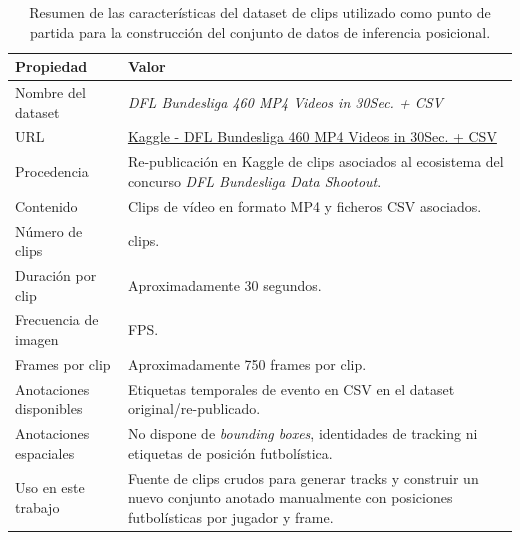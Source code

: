 \begin{table}[H]
\centering
\scriptsize
\renewcommand{\arraystretch}{1.2}
\begin{tabularx}{\textwidth}{
>{\raggedright\arraybackslash}p{4.0cm}
>{\raggedright\arraybackslash}X
}
\toprule
\textbf{Propiedad} & \textbf{Valor} \\
\midrule
Nombre del dataset &
\textit{DFL Bundesliga 460 MP4 Videos in 30Sec. + CSV} \\

URL &
\href{https://www.kaggle.com/datasets/saberghaderi/-dfl-bundesliga-460-mp4-videos-in-30sec-csv}{Kaggle - DFL Bundesliga 460 MP4 Videos in 30Sec. + CSV} \\

Procedencia &
Re-publicación en Kaggle de clips asociados al ecosistema del concurso \textit{DFL Bundesliga Data Shootout}. \\

Contenido &
Clips de vídeo en formato MP4 y ficheros CSV asociados. \\

Número de clips &
460 clips. \\

Duración por clip &
Aproximadamente 30 segundos. \\

Frecuencia de imagen &
25 FPS. \\

Frames por clip &
Aproximadamente 750 frames por clip. \\

Anotaciones disponibles &
Etiquetas temporales de evento en CSV en el dataset original/re-publicado. \\

Anotaciones espaciales &
No dispone de \textit{bounding boxes}, identidades de tracking ni etiquetas de posición futbolística. \\

Uso en este trabajo &
Fuente de clips crudos para generar tracks y construir un nuevo conjunto anotado manualmente con posiciones futbolísticas por jugador y frame. \\

\bottomrule
\end{tabularx}
\caption[Metadatos del dataset fuente de clips]{Resumen de las características del dataset de clips utilizado como punto de partida para la construcción del conjunto de datos de inferencia posicional.}
\label{tab:dataset_fuente_inferencia_posicional}
\end{table}

